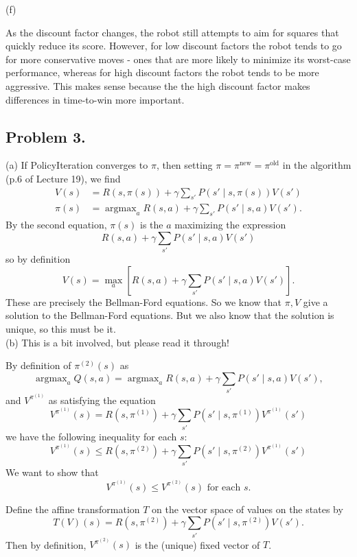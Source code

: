 \documentclass[12pt]{article}
\DeclareMathOperator{\argmax}{argmax}
\theoremstyle{remark}
\begin{document}
(f)

As the discount factor changes, the robot still attempts to aim for squares that quickly reduce its score. However, for low discount factors the robot tends to go for more conservative moves - ones that are more likely to minimize its worst-case performance, whereas for high discount factors the robot tends to be more aggressive. This makes sense because the the high discount factor makes differences in time-to-win more important.



\subsection*{Problem 3.}(a) If PolicyIteration converges to $\pi$, then setting $\pi = \pi^{\text{new}} = \pi^{\text{old}}$ in the algorithm (p.6 of Lecture 19), we find
\begin{align*}
V(s) &= R(s, \pi(s)) + \gamma \sum_{s'} P(s' \mid s, \pi(s)) V(s') \\
\pi(s) &= \argmax_a R(s,a) + \gamma \sum_{s'} P(s' \mid s,a) V(s').
\end{align*}
By the second equation, $\pi(s)$ is the $a$ maximizing the expression 
\[
R(s, a) + \gamma \sum_{s'} P(s' \mid s, a) V(s')
\]
so by definition 
\[
V(s) = \max_a \left[ R(s,a) + \gamma \sum_{s'} P(s' \mid s,a) V(s') \right].
\]
These are precisely the Bellman-Ford equations. So we know that $\pi,V$ give a solution to the Bellman-Ford equations. But we also know that the solution is unique, so this must be it. \\

\noindent (b) This is a bit involved, but please read it through!

By definition of $\pi^{(2)}(s)$ as 
\[
\argmax_a Q(s,a) = \argmax_a R(s,a) + \gamma \sum_{s'} P(s' \mid s,a) V(s'),
\]
and $V^{\pi^{(1)}}$ as satisfying the equation 
\[
V^{\pi^{(1)}} (s) = R(s, \pi^{(1)}) + \gamma \sum_{s'} P(s' \mid s, \pi^{(1)} ) V^{\pi^{(1)}}(s')
\]
we have the following inequality for each $s$:
\begin{equation}\label{3eq2}
V^{\pi^{(1)}} (s) \leq R(s, \pi^{(2)}) + \gamma \sum_{s'} P(s' \mid s, \pi^{(2)} ) V^{\pi^{(1)}}(s') 
\end{equation}
We want to show that 
\begin{equation}\label{3eq3}
V^{\pi^{(1)}}(s) \leq V^{\pi^{(2)}}(s) \text{ for each }s.
\end{equation}

Define the affine transformation $T$ on the vector space of values on the states by 
\[
T(V)(s) =  R(s, \pi^{(2)}) + \gamma \sum_{s'} P(s' \mid s, \pi^{(2)} ) V(s').
\]
Then by definition, $V^{\pi^{(2)}}(s)$ is the (unique) fixed vector of $T$. 
\end{document}
